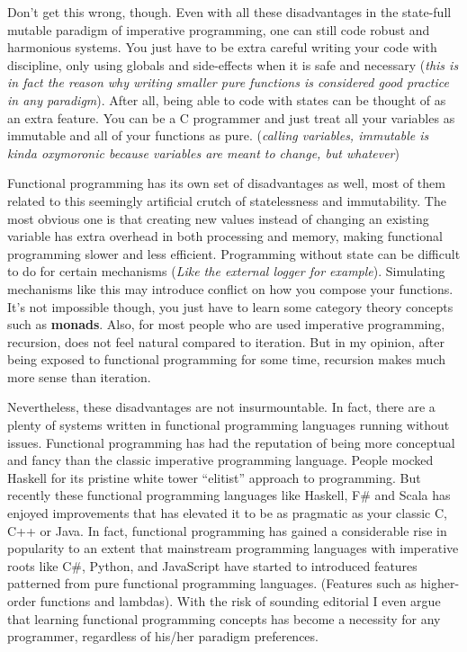 Don't get this wrong, though. Even with all these disadvantages in the
state-full mutable paradigm of imperative programming, one can still
code robust and harmonious systems. You just have to be extra careful
writing your code with discipline, only using globals and side-effects
when it is safe and necessary (\emph{this is in fact the reason why
writing smaller pure functions is considered good practice in any
paradigm}). After all, being able to code with states can be thought of
as an extra feature. You can be a C programmer and just treat all your
variables as immutable and all of your functions as pure. (\emph{calling
variables, immutable is kinda oxymoronic because variables are meant to
change, but whatever})

Functional programming has its own set of disadvantages as well, most of
them related to this seemingly artificial crutch of statelessness and
immutability. The most obvious one is that creating new values instead
of changing an existing variable has extra overhead in both processing
and memory, making functional programming slower and less efficient.
Programming without state can be difficult to do for certain mechanisms
(\emph{Like the external logger for example}). Simulating mechanisms
like this may introduce conflict on how you compose your functions. It's
not impossible though, you just have to learn some category theory
concepts such as \textbf{monads}. Also, for most people who are used
imperative programming, recursion, does not feel natural compared to
iteration. But in my opinion, after being exposed to functional
programming for some time, recursion makes much more sense than
iteration.

Nevertheless, these disadvantages are not insurmountable. In fact, there
are a plenty of systems written in functional programming languages
running without issues. Functional programming has had the reputation of
being more conceptual and fancy than the classic imperative programming
language. People mocked Haskell for its pristine white tower ``elitist''
approach to programming. But recently these functional programming
languages like Haskell, F\# and Scala has enjoyed improvements that has
elevated it to be as pragmatic as your classic C, C++ or Java. In fact,
functional programming has gained a considerable rise in popularity to
an extent that mainstream programming languages with imperative roots
like C\#, Python, and JavaScript have started to introduced features
patterned from pure functional programming languages. (Features such as
higher-order functions and lambdas). With the risk of sounding editorial
I even argue that learning functional programming concepts has become a
necessity for any programmer, regardless of his/her paradigm
preferences.\\

